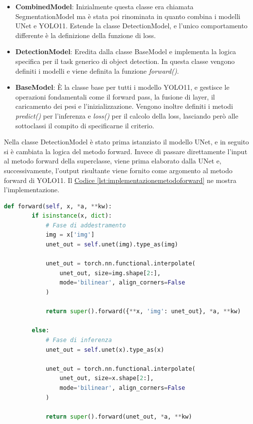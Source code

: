 \documentclass[12pt]{report}
\begin{document}
\begin{itemize}
	\item \textbf{CombinedModel}: Inizialmente questa classe era chiamata SegmentationModel ma è stata poi rinominata in quanto combina i modelli UNet e YOLO11. Estende la classe DetectionModel, e l'unico comportamento differente è la definizione della funzione di loss.
	
	\item \textbf{DetectionModel}: Eredita dalla classe BaseModel e implementa la logica specifica per il task generico di object detection. In questa classe vengono definiti i modelli e viene definita la funzione \textit{forward()}.
	
	\item \textbf{BaseModel}: È la classe base per tutti i modello YOLO11, e gestisce le operazioni fondamentali come il forward pass, la fusione di layer, il caricamento dei pesi e l'inizializzazione. Vengono inoltre definiti i metodi \textit{predict()} per l'inferenza e \textit{loss()} per il calcolo della loss, lasciando però alle sottoclassi il compito di specificarne il criterio.
\end{itemize}

Nella classe DetectionModel è stato prima istanziato il modello UNet, e in seguito si è cambiata la logica del metodo forward. Invece di passare direttamente l'input al metodo forward della superclasse, viene prima elaborato dalla UNet e, successivamente, l'output risultante viene fornito come argomento al metodo forward di YOLO11. Il \hyperref[lst:implementazionemetodoforward]{Codice \ref{lst:implementazionemetodoforward}} ne mostra l'implementazione.

\lstset{style=pythonstyle}
\begin{lstlisting}[language=Python, caption={Implementazione del metodo forward nella classe DetectionModel.}, label={lst:implementazionemetodoforward}, float]
	def forward(self, x, *a, **kw):
		if isinstance(x, dict):
			# Fase di addestramento
			img = x['img']
			unet_out = self.unet(img).type_as(img)
			
			unet_out = torch.nn.functional.interpolate(
				unet_out, size=img.shape[2:], 
				mode='bilinear', align_corners=False
			)
			
			return super().forward({**x, 'img': unet_out}, *a, **kw)
		
		else:
			# Fase di inferenza
			unet_out = self.unet(x).type_as(x)
			
			unet_out = torch.nn.functional.interpolate(
				unet_out, size=x.shape[2:], 
				mode='bilinear', align_corners=False
			)
			
			return super().forward(unet_out, *a, **kw)
\end{lstlisting}
\end{document}
